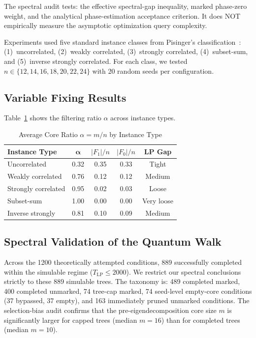 \documentclass[conference]{IEEEtran} \IEEEoverridecommandlockouts
\begin{document}
The spectral audit tests: the effective spectral-gap inequality, marked phase-zero weight, and the analytical phase-estimation acceptance criterion. It does NOT empirically measure the asymptotic optimization query complexity.

Experiments used five standard instance classes from Pisinger's classification~\cite{ref3}: (1)~uncorrelated, (2)~weakly correlated, (3)~strongly correlated, (4)~subset-sum, and (5)~inverse strongly correlated. For each class, we tested $n \in \{12, 14, 16, 18, 20, 22, 24\}$ with 20 random seeds per configuration.

\subsection{Variable Fixing Results}
Table~\ref{tab:fixing} shows the filtering ratio $\alpha$ across instance types.

\begin{table}[htbp] \caption{Average Core Ratio $\alpha = m/n$ by Instance Type} \label{tab:fixing} \begin{center} \begin{tabular}{lcccc} \toprule \textbf{Instance Type} & $\boldsymbol{\alpha}$ & $|F_1|/n$ & $|F_0|/n$ & \textbf{LP Gap} \\ \midrule Uncorrelated & 0.32 & 0.35 & 0.33 & Tight \\ Weakly correlated & 0.76 & 0.12 & 0.12 & Medium \\ Strongly correlated & 0.95 & 0.02 & 0.03 & Loose \\ Subset-sum & 1.00 & 0.00 & 0.00 & Very loose \\ Inverse strongly & 0.81 & 0.10 & 0.09 & Medium \\ \bottomrule \end{tabular} \end{center} \end{table}

\subsection{Spectral Validation of the Quantum Walk}
Across the 1200 theoretically attempted conditions, 889 successfully completed within the simulable regime ($T_{\text{LP}} \le 2000$). We restrict our spectral conclusions strictly to these 889 simulable trees. The taxonomy is: 489 completed marked, 400 completed unmarked, 74 tree-cap marked, 74 seed-level empty-core conditions (37 bypassed, 37 empty), and 163 immediately pruned unmarked conditions. The selection-bias audit confirms that the pre-eigendecomposition core size $m$ is significantly larger for capped trees (median $m=16$) than for completed trees (median $m=10$).
\end{document}
